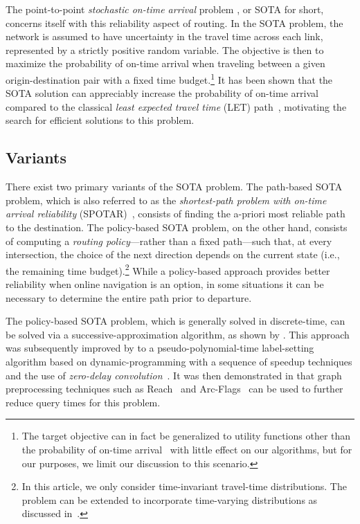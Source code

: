 \documentclass[oribibl]{llncs}
\begin{document}
		The point-to-point \textit{stochastic on-time arrival} problem \cite{fan2005arriving},
		or SOTA for short, concerns itself with this reliability aspect of routing.
		In the SOTA problem, the network is assumed to have uncertainty in the travel time across each link,
		represented by a strictly positive random variable.
		The objective is then to maximize the probability of on-time arrival
		when traveling between a given origin-destination pair with a fixed time budget.\footnote
		{
			The target objective can in fact be generalized to utility functions other than the probability
			of on-time arrival~\cite{blandin2014robust} with little effect on our algorithms,
			but for our purposes, we limit our discussion to this scenario.
		}
		It has been shown that the SOTA solution can appreciably increase the probability of on-time arrival compared to
		the classical \textit{least expected travel time} (LET) path~\cite{samaranayake2012tractable}, motivating the
		search for efficient solutions to this problem.

		\subsection{Variants}
		There exist two primary variants of the SOTA problem.
		The path-based SOTA problem, which is also referred to as the
		\textit{shortest-path problem with on-time arrival reliability} (SPOTAR)~\cite{nie2009shortest},
		consists of finding the a-priori most reliable path to the destination.
		The policy-based SOTA problem, on the other hand, consists of computing a \textit{routing policy}---rather
		than a fixed path---such that, at every intersection, the choice of the next direction
		depends on the current state (i.e., the remaining time budget).\footnote
		{
			In this article, we only consider time-invariant travel-time distributions.
			The problem can be extended to incorporate time-varying distributions as discussed in~\cite{samaranayake2012tractable}.
		}
		While a policy-based approach provides better reliability when online navigation is an option,
		in some situations it can be necessary to determine the entire path prior to departure.

		The policy-based SOTA problem, which is generally solved in discrete-time,
		can be solved via a successive-approximation algorithm, as shown by \citet{fan2006optimal}. This approach
		was subsequently improved by \citet{samaranayake2012tractable} to a pseudo-polynomial-time label-setting algorithm
		based on dynamic-programming with a sequence of speedup techniques and the use of
		\textit{zero-delay convolution}~\cite{dean2010speeding, samaranayake2012speedup}.
		It was then demonstrated in \citet{sabran2014precomputation} that
		graph preprocessing techniques such as Reach~\cite{gutman2004reach}
		and Arc-Flags~\cite{hilger2009fast} can be used to further reduce query times for this problem.
\end{document}
